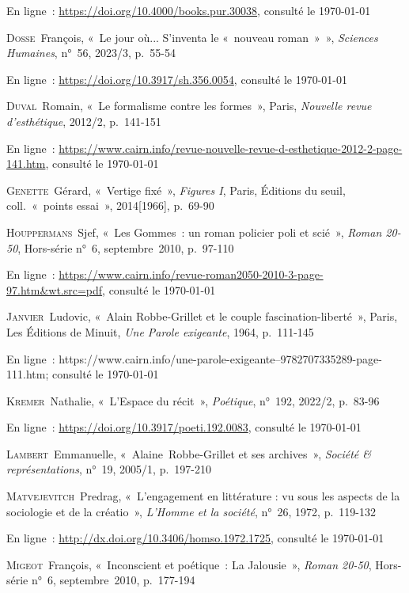 \documentclass[12pt, a4paper]{article}
\begin{document}
			En ligne~: \hyperlink{https://doi.org/10.4000/books.pur.30038}{https://doi.org/10.4000/books.pur.30038}, consulté le \today
		\par
	\textsc{Dosse}~François, «~Le jour où... S'inventa le «~nouveau roman~»~»,  \textit{Sciences Humaines}, n°~56, 2023/3, p.~55-54
			
			En ligne~: \hyperlink{https://doi.org/10.3917/sh.356.0054}{https://doi.org/10.3917/sh.356.0054}, consulté le \today
		\par
	\textsc{Duval}~Romain, «~Le formalisme contre les formes~», Paris, \textit{Nouvelle revue d’esthétique}, 2012/2, p.~141-151
			
			En ligne~: \hyperlink{https://www.cairn.info/revue-nouvelle-revue-d-esthetique-2012-2-page-141.htm}{https://www.cairn.info/revue-nouvelle-revue-d-esthetique-2012-2-page-141.htm}, consulté le \today
		\par
	\textsc{Genette}~Gérard, «~Vertige fixé~», \textit{Figures I}, Paris, Éditions du seuil, coll.~«~points essai~», 2014[1966], p.~69-90\par
	\textsc{Houppermans}~Sjef, «~Les Gommes~: un roman policier poli et scié~»,  \textit{Roman 20-50}, Hors-série n°~6, septembre~2010, p.~97-110
			
			En ligne~: \hyperlink{https://www.cairn.info/revue-roman2050-2010-3-page-97.htm\&wt.src=pdf}{https://www.cairn.info/revue-roman2050-2010-3-page-97.htm\&wt.src=pdf}, consulté le \today
		\par
	\textsc{Janvier}~Ludovic, «~Alain Robbe-Grillet et le couple fascination-liberté~», Paris, Les Éditions de Minuit, \textit{Une Parole exigeante}, 1964, p.~111-145

En ligne~: https://www.cairn.info/une-parole-exigeante--9782707335289-page-111.htm; consulté le \today \par
	\textsc{Kremer}~Nathalie, «~L'Espace du récit~»,  \textit{Poétique}, n°~192, 2022/2, p.~83-96
			
			En ligne~: \hyperlink{https://doi.org/10.3917/poeti.192.0083}{https://doi.org/10.3917/poeti.192.0083}, consulté le \today
		\par
	\textsc{Lambert}~Emmanuelle, «~Alaine~Robbe-Grillet et ses archives~»,  \textit{Société \& représentations}, n°~19, 2005/1, p.~197-210\par
	\textsc{Matvejevitch}~Predrag, «~L'engagement en littérature : vu sous les aspects de la sociologie et de la créatio~»,  \textit{L'Homme et la société}, n°~26, 1972, p.~119-132
			
			En ligne~: \hyperlink{http://dx.doi.org/10.3406/homso.1972.1725}{http://dx.doi.org/10.3406/homso.1972.1725}, consulté le \today
		\par
	\textsc{Migeot}~François, «~Inconscient et poétique~: La Jalousie~»,  \textit{Roman 20-50}, Hors-série n°~6, septembre~2010, p.~177-194
			
\end{document}
